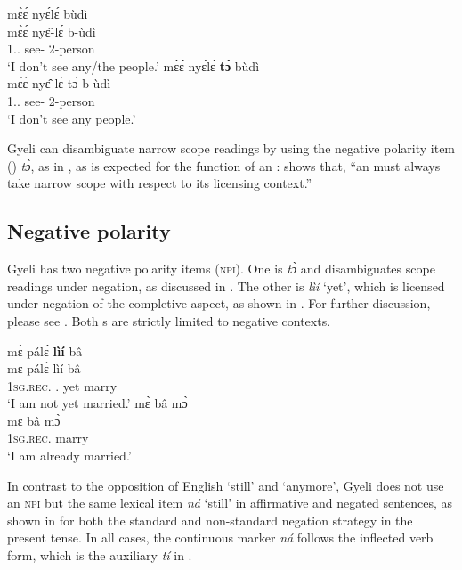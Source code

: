 \documentclass[output=paper,colorlinks=true, citecolor=brown,draftmode]{langscibook}
\begin{document}
\ea\label{NPI}
\ea\label{NPI1} 
  \glll      mɛ̀ɛ́ nyɛ́lɛ́ bùdì \\
          mɛ̀ɛ́ nyɛ̂-lɛ́ b-ùdì \\
              1{\SG}.{\PRS}.{\NEG} see-{\NEG} 2-person   \\
    \trans `I don't see any/the people.'
\ex\label{NPI2}    
  \glll      mɛ̀ɛ́ nyɛ́lɛ́ {\bfseries tɔ̀} bùdì \\
          mɛ̀ɛ́ nyɛ̂-lɛ́ tɔ̀ b-ùdì \\
              1{\SG}.{\PRS}.{\NEG} see-{\NEG} {\NPI} 2-person   \\
    \trans `I don't see any people.'
\z
\z

Gyeli can disambiguate narrow scope readings by using the negative polarity item ({\NPI}) {\itshape tɔ̀}, as in , as is expected for the function of an {\NPI}: \citet[483]{Barker2018} shows that, ``an {\NPI} must always take narrow scope with respect to its licensing context.''

\subsection{Negative polarity}
\label{sec:gye:NegPol}

Gyeli has two negative polarity items (\textsc{npi}). One is {\itshape tɔ̀} and disambiguates scope readings under negation, as discussed in . The other is {\itshape lìí} `yet', which is licensed under negation of the completive aspect, as shown in . For further discussion, please see \citet[477]{Grimm2021}.
Both {\NPI}s are strictly limited to negative contexts. 

\ea \label{lii}
\ea \label{lii1}
  \glll  mɛ̀ pálɛ́ {\bfseries lìí} bâ \\
          mɛ pálɛ́ lìí bâ \\
          1\textsc{sg}.{\textsc{rec.}\PST} {\NEG}.{\PST} yet marry\\
    \trans `I am not yet married.'
\ex \label{lii2}
  \glll  mɛ̀ bâ mɔ̀ \\
          mɛ bâ mɔ̀ \\
          1\textsc{sg}.{\textsc{rec.}\PST} marry {\COMPL} \\
    \trans `I am already married.'    
\z
\z

In contrast to the opposition of English `still' and 
`anymore', Gyeli does not use an \textsc{npi} but the same lexical item {\itshape ná} `still' in affirmative and negated sentences, as shown in  for both the standard and non-standard negation strategy in the present tense. In all cases, the continuous marker {\itshape ná} follows the inflected verb form, which is the auxiliary {\itshape tí} in .  
\end{document}
